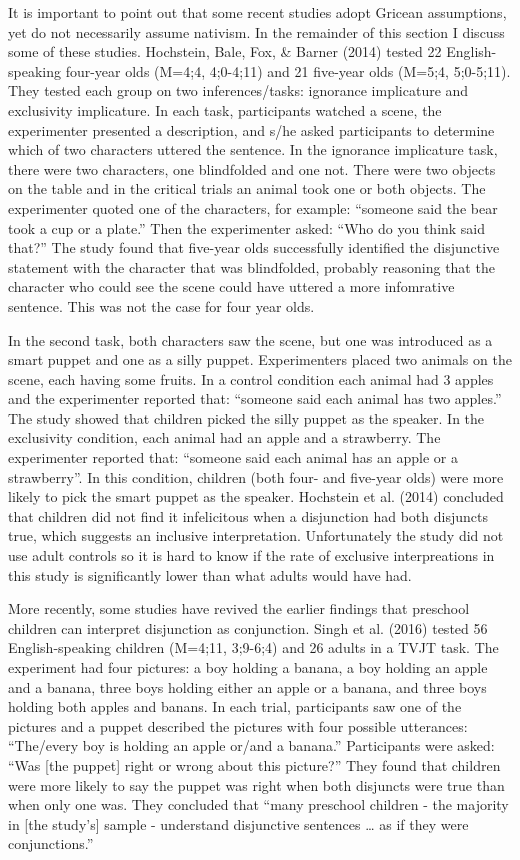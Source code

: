 \documentclass[oneside]{report}
\theoremstyle{definition}
\theoremstyle{definition}
\theoremstyle{definition}
\theoremstyle{remark}
\begin{document}
It is important to point out that some recent studies adopt Gricean
assumptions, yet do not necessarily assume nativism. In the remainder of
this section I discuss some of these studies. Hochstein, Bale, Fox, \&
Barner (2014) tested 22 English-speaking four-year olds (M=4;4,
4;0-4;11) and 21 five-year olds (M=5;4, 5;0-5;11). They tested each
group on two inferences/tasks: ignorance implicature and exclusivity
implicature. In each task, participants watched a scene, the
experimenter presented a description, and s/he asked participants to
determine which of two characters uttered the sentence. In the ignorance
implicature task, there were two characters, one blindfolded and one
not. There were two objects on the table and in the critical trials an
animal took one or both objects. The experimenter quoted one of the
characters, for example: ``someone said the bear took a cup or a
plate.'' Then the experimenter asked: ``Who do you think said that?''
The study found that five-year olds successfully identified the
disjunctive statement with the character that was blindfolded, probably
reasoning that the character who could see the scene could have uttered
a more infomrative sentence. This was not the case for four year olds.

In the second task, both characters saw the scene, but one was
introduced as a smart puppet and one as a silly puppet. Experimenters
placed two animals on the scene, each having some fruits. In a control
condition each animal had 3 apples and the experimenter reported that:
``someone said each animal has two apples.'' The study showed that
children picked the silly puppet as the speaker. In the exclusivity
condition, each animal had an apple and a strawberry. The experimenter
reported that: ``someone said each animal has an apple or a
strawberry''. In this condition, children (both four- and five-year
olds) were more likely to pick the smart puppet as the speaker.
Hochstein et al. (2014) concluded that children did not find it
infelicitous when a disjunction had both disjuncts true, which suggests
an inclusive interpretation. Unfortunately the study did not use adult
controls so it is hard to know if the rate of exclusive interpreations
in this study is significantly lower than what adults would have had.

More recently, some studies have revived the earlier findings that
preschool children can interpret disjunction as conjunction. Singh et
al. (2016) tested 56 English-speaking children (M=4;11, 3;9-6;4) and 26
adults in a TVJT task. The experiment had four pictures: a boy holding a
banana, a boy holding an apple and a banana, three boys holding either
an apple or a banana, and three boys holding both apples and banans. In
each trial, participants saw one of the pictures and a puppet described
the pictures with four possible utterances: ``The/every boy is holding
an apple or/and a banana.'' Participants were asked: ``Was {[}the
puppet{]} right or wrong about this picture?'' They found that children
were more likely to say the puppet was right when both disjuncts were
true than when only one was. They concluded that ``many preschool
children - the majority in {[}the study's{]} sample - understand
disjunctive sentences \ldots{} as if they were conjunctions.''
\end{document}
